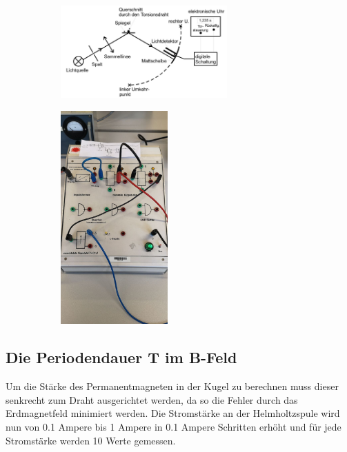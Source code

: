 \begin{figure}[h]
    \begin{subfigure}[c]{0.5\textwidth}
        \centering
        \includegraphics[width=0.7\textwidth, height=0.6\textwidth]{bilder/lichtuhr.jpeg}
        \label{fig:lichtuhr}
    \end{subfigure}
    \begin{subfigure}[c]{0.5\textwidth}
        \centering
        \includegraphics[width=0.45\textwidth, height=0.6\textwidth]{bilder/Schaltung.jpeg}
        \label{fig:Schaltung}
    \end{subfigure}
\end{figure}


\subsection{Die Periodendauer T im B-Feld}
Um die Stärke des Permanentmagneten in der Kugel zu berechnen muss dieser senkrecht zum Draht ausgerichtet werden, da so die Fehler durch das Erdmagnetfeld minimiert werden.
Die Stromstärke an der Helmholtzspule wird nun von 0.1 Ampere bis 1 Ampere in 0.1 Ampere Schritten erhöht und für jede Stromstärke werden 10 Werte gemessen.